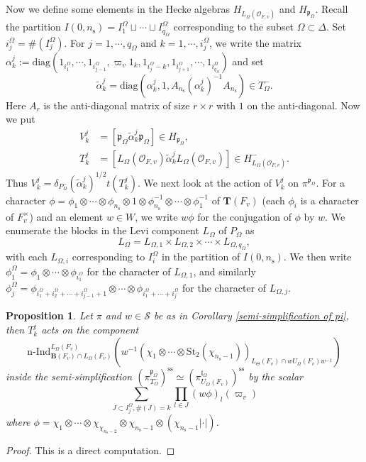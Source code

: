 \documentclass[12pt,oneside,reqno]{amsart}
\theoremstyle{plain}
\newtheorem{proposition}[theorem]{Proposition}
\begin{document}
	
	Now we define some elements in
	the Hecke algebras
	$H_{L_\Omega(\mathcal{O}_{F,v})}$
	and
	$H_{\mathfrak{p}_\Omega}$.
	Recall the partition
	$I(0,n_\mathrm{s})
	=
	I_1^\Omega\sqcup\cdots
	\sqcup I_{q_\Omega}^\Omega$
	corresponding to the subset
	$\Omega\subset\Delta$.
	Set
	$i_j^\Omega=\# (I_j^\Omega)$.
	For $j=1,\cdots,q_\Omega$
	and
	$k=1,\cdots,i_j^\Omega$,
	we write the matrix
	$\alpha^j_k
	:=\mathrm{diag}
	(1_{i_1^\Omega},
	\cdots,
	1_{i_{j-1}^\Omega},
	\varpi_v1_k,
	1_{i_j^\Omega-k},
	1_{i_{j+1}^\Omega},
	\cdots,
	1_{i_{q_\Omega}^\Omega})$
	and set
	\[
	\widetilde{\alpha}_k^j
	=
	\mathrm{diag}
	(\alpha_k^j,1,
	A_{n_\mathrm{s}}
	(\alpha_k^j)^{-1}
	A_{n_\mathrm{s}})
	\in
	T_\Omega^-.
	\]
	Here
	$A_r$
	is the anti-diagonal matrix of size $r\times r$
	with $1$ on the anti-diagonal.
	Now we put
	\begin{align*}
		V_k^j
		&
		=
		[\mathfrak{p}_\Omega\widetilde{\alpha}_k^j\mathfrak{p}_\Omega]
		\in
		H_{\mathfrak{p}_\Omega},
		\\
		T_k^j
		&
		=
		[L_\Omega(\mathcal{O}_{F,v})\widetilde{\alpha}_k^j
		L_\Omega(\mathcal{O}_{F,v})]
		\in
		H^-_{L_\Omega(\mathcal{O}_{F,v})}.
	\end{align*}
	Thus $V_k^j=\delta_{P_\Omega^-}(\widetilde{\alpha}_k^j)^{1/2}t(T_k^j)$.
	We next look at the action of $V_k^j$ on $\pi^{\mathfrak{p}_\Omega}$.
	For a character $\phi=\phi_1\otimes\cdots\otimes\phi_{n_\mathrm{s}}
	\otimes1\otimes\phi_{n_\mathrm{s}}^{-1}\otimes\cdots\otimes\phi_1^{-1}$
	of $\mathbf{T}(F_v)$ (each $\phi_i$ is a character of $F_v^\times$)
	and an element $w\in W$, we write $w\phi$ for the conjugation of $\phi$ by $w$. We enumerate the blocks in the Levi component $L_\Omega$ of $P_\Omega$ as
	\[
	L_{\Omega}=
	L_{\Omega,1}\times L_{\Omega,2}\times\cdots\times
	L_{\Omega,q_\Omega},
	\]
	with each $L_{\Omega,i}$ corresponding to $I_i^\Omega$ in the partition of $I(0,n_\mathrm{s})$. We then write $\phi_1^\Omega=\phi_1\otimes\cdots\otimes\phi_{i_1^\Omega}$
	for the character of $L_{\Omega,1}$, and similarly
	$\phi_j^\Omega
	=
	\phi_{i_1^\Omega+i_2^\Omega+\cdots+i_{j-1}^\Omega+1}
	\otimes
	\cdots
	\otimes
	\phi_{i_1^\Omega+\cdots+i_j^\Omega}$
	for the character of $L_{\Omega,j}$.
	\begin{proposition}
		Let $\pi$ and $w\in\mathcal{S}$ be as in Corollary \ref{semi-simplification of pi}, then $T_k^j$ acts on the component
		\[
		\mathrm{n}
		\text{-}
		\mathrm{Ind}_{\mathbf{B}(F_v)\cap L_\Omega(F_v)}^{L_\Omega(F_v)}
		\left(
		w^{-1}
		(\chi_1\otimes\cdots\otimes\mathrm{St}_2(\chi_{n_{\mathrm{s}}-1}))_{
			L_\Theta(F_v)\cap wU_\Omega(F_v)w^{-1}}
		\right)
		\]
		inside the semi-simplification $(
		\pi^{\mathfrak{p}_\Omega}_{T_\Omega^-}
		)^\mathrm{ss}
		\simeq
		(\pi_{U_\Omega(F_v)}^{\mathfrak{l}_\Omega})^\mathrm{ss}$
		by the scalar
		\[
		\sum_{J\subset I_j^\Omega,\# (J)=k}
		\prod_{l\in J}
		(w\phi)_l(\varpi_v)
		\]
		where
		$\phi=\chi_1\otimes\cdots\otimes\chi_{\chi_{n_{\mathrm{s}}-2}}
		\otimes\chi_{n_{\mathrm{s}}-1}\otimes(\chi_{n_{\mathrm{s}}-1}|\cdot|)$.
	\end{proposition}
	\begin{proof}
		This is a direct computation.
	\end{proof}
	
\end{document}
